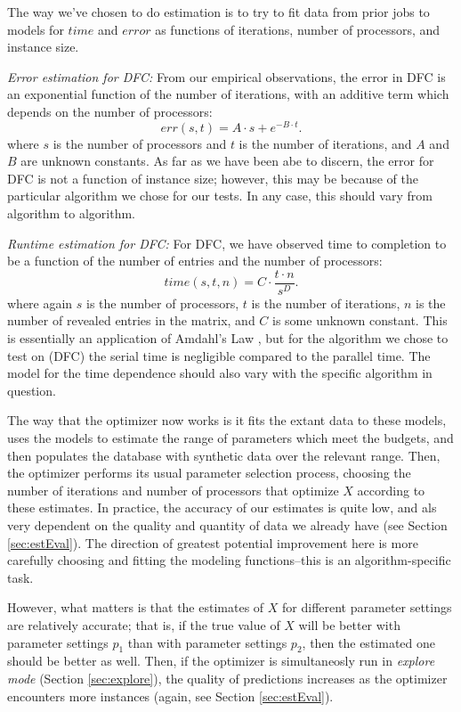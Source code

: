 The way we've chosen to do estimation is to try to fit data from
prior jobs to models for $time$ and $error$ as functions of iterations, 
number of processors, and instance size. 


{\em Error estimation for DFC:} From our empirical observations, the 
error in DFC is an exponential function of the number of iterations, 
with an additive term which depends on the number of processors:
\[
err(s,t) = A\cdot s + e^{-B\cdot t}.
\]
where $s$ is the number of processors and $t$ is the number of iterations, 
and $A$ and $B$ are unknown constants. As far as we have been abe to 
discern, the error for DFC is not a function of instance size; however, this
may be because of the particular algorithm we chose for our tests. In 
any case, this should vary from algorithm to algorithm.

{\em Runtime estimation for DFC:} For DFC, we have observed time to 
completion to be a function of the number of entries and the number 
of processors:
\[
time(s,t,n) = C\cdot\frac{t\cdot n}{s^D}.
\]
where again $s$ is the number of processors, $t$ is the number of 
iterations, $n$ is the number of revealed entries in the matrix, 
and $C$ is some unknown constant. This is essentially an application of 
Amdahl's Law \cite{A67}, but for the algorithm we chose to test on (DFC) the
serial time is negligible compared to the parallel time. The model
for the time dependence should also vary with the specific algorithm
in question. 

The way that the optimizer now works is it fits the extant data to
these models, uses the models to estimate the range of parameters 
which meet the budgets, and then populates the database with synthetic data 
over the relevant range. Then, the optimizer performs its usual
parameter selection process, choosing the  number of iterations 
and number of processors that optimize $X$ according to these estimates. 
In practice, the accuracy of our estimates is quite low, and als very 
dependent on the quality and quantity of data we already have 
(see Section \ref{sec:estEval}). The direction of greatest potential 
improvement here is more carefully choosing and fitting 
the modeling functions--this is an algorithm-specific task.

However, what matters is that the estimates of $X$ for different 
parameter settings are relatively accurate; that is, if the true value 
of $X$ will be better with parameter settings $p_1$ than with parameter
settings $p_2$, then the estimated one should be better as well. Then, 
if the optimizer is simultaneosly run in {\em explore mode}
(Section \ref{sec:explore}), the quality
of predictions increases as the optimizer encounters more 
instances (again, see Section \ref{sec:estEval}).

